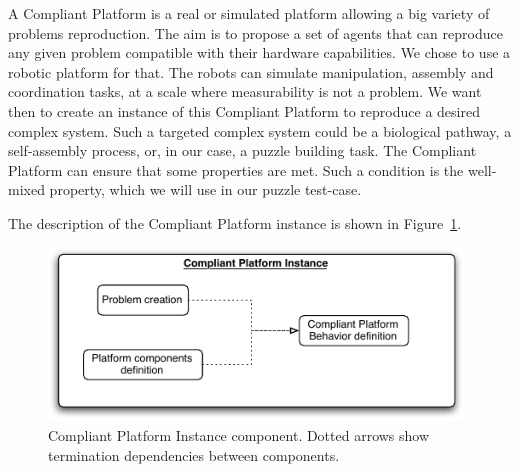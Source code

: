 \documentclass[letterpaper, oneside]{article}
\begin{document}
A Compliant Platform is a real or simulated platform allowing a big variety of problems reproduction. The aim is to propose a set of agents that can reproduce any given problem compatible with their hardware capabilities. We chose to use a robotic platform for that. The robots can simulate manipulation, assembly and coordination tasks, at a scale where measurability is not a problem. We want then to create an instance of this Compliant Platform to reproduce a desired complex system. Such a targeted complex system could be a biological pathway, a self-assembly process, or, in our case, a puzzle building task. The Compliant Platform can ensure that some properties are met. Such a condition is the well-mixed property, which we will use in our puzzle test-case.

The description of the Compliant Platform instance is shown in Figure~\ref{fig:img_compliant_platform_instance}.

\begin{figure}[h!]
	\centering
		\includegraphics[width=11cm]{img/compliant_platform_instance.pdf}
	\caption{Compliant Platform Instance component. Dotted arrows show termination dependencies between components.}
	\label{fig:img_compliant_platform_instance}
\end{figure}
\end{document}
